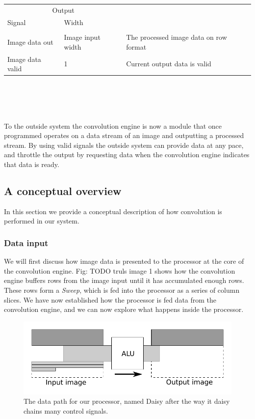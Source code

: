 \\ \\ \\ \\
\begin{tabular}{ l | l | l}
    \multicolumn{2}{c}{Output}
    \hline \\
    Signal & Width\\
    \hline \\
    Image data out          & Image input width     & The processed image data on row format\\
    Image data valid        & 1                     & Current output data is valid
\end{tabular}
\\ \\ \\ \\
To the outside system the convolution engine is now a module that once programmed operates on a data stream of an image and outputting a processed stream. 
By using valid signals the outside system can provide data at any pace, and throttle the output by requesting data when the convolution engine indicates that data is ready. 

\subsection{A conceptual overview}
In this section we provide a conceptual description of how convolution is performed in our system.

\subsubsection{Data input}
We will first discuss how image data is presented to the processor at the core of the convolution engine.
Fig: TODO truls image 1 shows how the convolution engine buffers rows from the image input until it has accumulated enough rows.
These rows form a \textit{Sweep}, which is fed into the processor as a series of column slices.
We have now established how the processor is fed data from the convolution engine, and we can now explore what happens inside the processor.

\begin{figure}[h!]
    \includegraphics[width=\linewidth]{img/daisy_processing.pdf}
    \caption{The data path for our processor, named Daisy after the way it daisy chains many control signals.}
    \label{fig:Convolution}
\end{figure}

